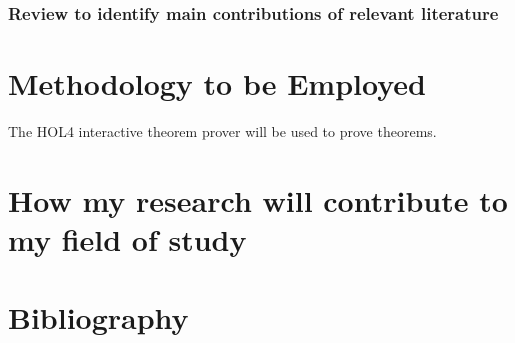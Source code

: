\documentclass{article}
\begin{document}
\subsubsection{Review to identify main contributions of relevant literature}

\section{Methodology to be Employed}

The HOL4 interactive theorem prover will be used to prove theorems.

\section{How my research will contribute to my field of study}

\section{Bibliography}
\end{document}
